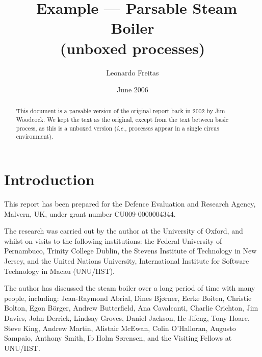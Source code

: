 \documentclass{report}
\begin{document}


\title{\Circus\ Example --- Parsable Steam Boiler\\ (unboxed processes)}
\author{Leonardo Freitas}
\date{June 2006}

\maketitle

\begin{abstract}
   \noindent This document is a parsable version of the original report
   back in 2002 by Jim Woodcock. We kept the text as the original, except
   from the text between basic process, as this is a unboxed version (\textit{i.e.},
   processes appear in a single circus environment).
\end{abstract}



\newpage %

\tableofcontents %

\newpage %


\chapter{Introduction}


This report has been prepared for the Defence Evaluation and Research
Agency, Malvern, UK, under grant number CU009-0000004344.

The research was carried out by the author at the University of
Oxford, and whilst on visits to the following institutions: the
Federal University of Pernambuco, Trinity College Dublin, the Stevens
Institute of Technology in New Jersey, and the United Nations
University, International Institute for Software Technology in Macau
(UNU/IIST).

The author has discussed the steam boiler over a long period of time
with many people, including: Jean-Raymond Abrial, Dines Bj{\o}rner,
Eerke Boiten, Christie Bolton, Egon B\"{o}rger, Andrew Butterfield,
Ana Cavalcanti, Charlie Crichton, Jim Davies, John Derrick, Lindsay
Groves, Daniel Jackson, He Jifeng, Tony Hoare, Steve King, Andrew
Martin, Alistair \hbox{McEwan}, Colin O'Halloran, Augusto Sampaio,
Anthony Smith, Ib Holm S{\o}rensen, and the Visiting Fellows at
UNU/IIST.
\end{document}
